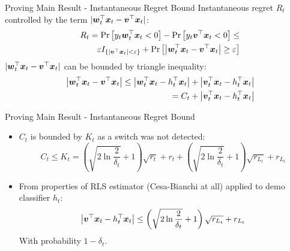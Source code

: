 \documentclass{beamer}
\begin{document}
\begin{frame}{Proving Main Result - Instantaneous Regret Bound}
Instantaneous regret $R_t$ controlled by the term $|{{\boldsymbol{w}}}^{\top}_{t}{\boldsymbol{x}}_{t}-{{\boldsymbol{v}}}^{\top}{\boldsymbol{x}}_{t}|$:
\begin{eqnarray}
&&R_t={\rm Pr}\left[{y_t{{\boldsymbol{w}}}^{\top}_{t}{\boldsymbol{x}}_{t}<0}\right]-{\rm Pr}\left[{y_t{{\boldsymbol{v}}}^{\top}{\boldsymbol{x}}_{t}<0}\right]\leq\nonumber\\
&&\varepsilon I_{\{\left|{{\boldsymbol{v}}}^{\top}{\boldsymbol{x}}_{t}\right|<\varepsilon\}}+{\rm Pr}\left[{\left|{{\boldsymbol{w}}}^{\top}_{t}{\boldsymbol{x}}_{t}-{{\boldsymbol{v}}}^{\top}{\boldsymbol{x}}_{t}\right|\geq\varepsilon}\right]
\label{regret_wt_ht1}
\end{eqnarray}
$|{{\boldsymbol{w}}}^{\top}_{t}{\boldsymbol{x}}_{t}-{{\boldsymbol{v}}}^{\top}{\boldsymbol{x}}_{t}|$ can be bounded by triangle inequality:
\begin{eqnarray}
&&\left\vert{{\boldsymbol{w}}}^{\top}_{t}{\boldsymbol{x}}_{t}-{{\boldsymbol{v}}}^{\top}{\boldsymbol{x}}_{t}\right\vert\leq\left\vert{{\boldsymbol{w}}}^{\top}_{t}{\boldsymbol{x}}_{t}-h_{t}^{\top}{\boldsymbol{x}}_{t}\right\vert+\left\vert{{\boldsymbol{v}}}^{\top}_{t}{\boldsymbol{x}}_{t}-h_{t}^{\top}{\boldsymbol{x}}_{t}\right\vert\nonumber\\
&&=C_t+\left\vert{{\boldsymbol{v}}}^{\top}_{t}{\boldsymbol{x}}_{t}-h_{t}^{\top}{\boldsymbol{x}}_{t}\right\vert
\label{triangl_ht_wt}
\end{eqnarray}
\end{frame}

\begin{frame}{Proving Main Result - Instantaneous Regret Bound}
\begin{itemize}
\item $C_t$ is bounded by $K_t$ as a switch was not detected:
\begin{equation}
C_t\leq K_t=\left(\sqrt{2\ln{\frac{2}{\delta_t}}}+1\right)\sqrt{r_t}+r_t+\left(\sqrt{2\ln{\frac{2}{\delta_t}}}+1\right)\sqrt{r_{L_t}}+r_{L_t} 
\end{equation}
\item From properties of RLS estimator (Cesa-Bianchi at all) applied to demo classifier $h_t$:
\begin{equation}
\left\vert{{\boldsymbol{v}}}^{\top}{\boldsymbol{x}}_{t}-h_{t}^{\top}{\boldsymbol{x}}_{t}\right\vert\leq\left(\sqrt{2\ln{\frac{2}{\delta_t}}}+1\right)\sqrt{r_{L_t}}+r_{L_t}
\label{rLt_false}
\end{equation}
With probability $1-\delta_t$.
\end{itemize}
\end{frame}
\end{document}
